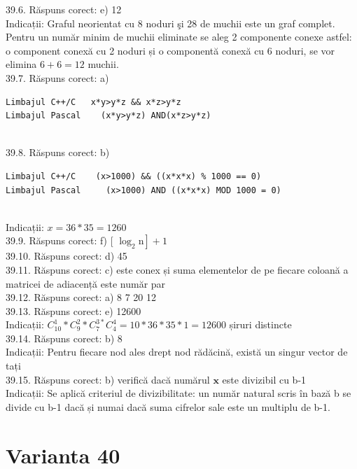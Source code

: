 39.6. Răspuns corect: e) 12\\
Indicații: Graful neorientat cu 8 noduri şi 28 de muchii este un graf complet. Pentru un număr minim de muchii eliminate se aleg 2 componente conexe astfel: o component conexă cu 2 noduri și o componentă conexă cu 6 noduri, se vor elimina $6+6=12$ muchii.\\

39.7. Răspuns corect: a) \begin{verbatim}
Limbajul C++/C   x*y>y*z && x*z>y*z 
Limbajul Pascal    (x*y>y*z) AND(x*z>y*z)
\end{verbatim}\\

39.8. Răspuns corect: b) \begin{verbatim}
Limbajul C++/C    (x>1000) && ((x*x*x) % 1000 == 0) 
Limbajul Pascal     (x>1000) AND ((x*x*x) MOD 1000 = 0)
\end{verbatim}\\
Indicații: $x=36 * 35=1260$\\

39.9. Răspuns corect: f) [ $\left.\log _{2} \mathrm{n}\right]+1$\\

39.10. Răspuns corect: d) 45\\

39.11. Răspuns corect: c) este conex și suma elementelor de pe fiecare coloană a matricei de adiacență este număr par\\

39.12. Răspuns corect: a) 8 7 20 12\\

39.13. Răspuns corect: e) 12600\\
Indicații: $C_{10}^{1} * C_{9}^{2} * C_{7}^{3 *} C_{4}^{4}=10 * 36 * 35 * 1=12600$ șiruri distincte\\

39.14. Răspuns corect: b) 8\\
Indicații: Pentru fiecare nod ales drept nod rădăcină, există un singur vector de tați\\

39.15. Răspuns corect: b) verifică dacă numărul $\mathbf{x}$ este divizibil cu b-1\\
Indicații: Se aplică criteriul de divizibilitate: un număr natural scris în bază b se divide cu b-1 dacă și numai dacă suma cifrelor sale este un multiplu de b-1.\\

\section*{Varianta 40}

